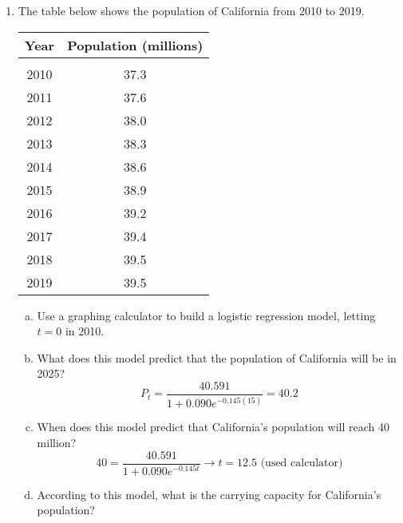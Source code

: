 \begin{enumerate}
\item The table below shows the population of California from 2010 to 2019.
\begin{center}
\begin{tabular}{c c}
\textbf{Year} & \textbf{Population (millions)}\\
\hline
 & \\
2010 & 37.3\\
2011 & 37.6\\
2012 & 38.0\\
2013 & 38.3\\
2014 & 38.6\\
2015 & 38.9\\
2016 & 39.2\\
2017 & 39.4\\
2018 & 39.5\\
2019 & 39.5
\end{tabular}
\end{center}
\begin{enumerate}[(a)]
\item Use a graphing calculator to build a logistic regression model, letting $t=0$ in 2010. 
\item What does this model predict that the population of California will be in 2025? 
\[P_t = \dfrac{40.591}{1+0.090e^{-0.145(15)}} = 40.2\]
\item When does this model predict that California's population will reach 40 million? 
\[40 = \dfrac{40.591}{1+0.090e^{-0.145t}} \longrightarrow t = 12.5 \textrm{ (used calculator)}\]
\item According to this model, what is the carrying capacity for California's population? 
\end{enumerate}


\end{enumerate}
